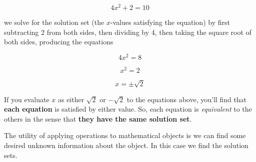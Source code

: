 \documentclass{ximera}
\begin{document}
\begin{exploration}
\begin{remark}
      $$4x^2+2=10$$
      
      we solve for the solution set (the $x$-values satisfying the equation) by first subtracting 2 from both sides, then dividing by 4, then taking the square root of both sides, producing the equations
      
      $$4x^2=8$$
      
      $$x^2=2$$
      
      $$x=\pm\sqrt{2}$$
      
      If you evaluate $x$ as either $\sqrt{2}$ or $-\sqrt{2}$ to the equations above, you'll find that {\bf each equation} is satisfied by either value. So, each equation is \emph{equivalent} to the others in the sense that {\bf they have the same solution set}.
      
      The utility of applying operations to mathematical objects is we can find some desired unknown information about the object. In this case we find the solution sets.
      
      \end{remark}

  \end{exploration}
\end{document}
